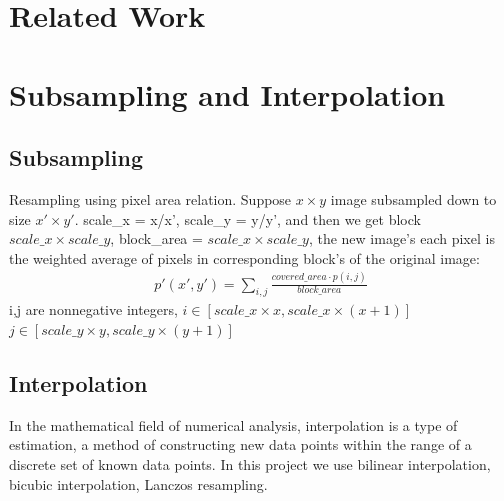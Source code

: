 \documentclass[journal,conference]{IEEEtran}
\begin{document}
\section{Related Work}
\section{Subsampling and Interpolation}

\subsection{Subsampling}
Resampling using pixel area relation. Suppose $x\times y$ image subsampled down to size $x'\times y'$. scale\_x = x/x', scale\_y = y/y', and then we get block $scale\_x \times scale\_y$, block\_area = $scale\_x \times scale\_y$, the new image's each pixel is the weighted average of pixels in corresponding block's of the original image: 
\begin{align*}
	p'(x',y')=\sum_{i,j}{\frac{covered\_area \cdot p(i,j)}{block\_area}}
\end{align*}
i,j are nonnegative integers, $i \in [scale\_x\times x,scale\_x\times (x+1)]$ $j \in [scale\_y\times y,scale\_y\times (y+1)]$

\subsection{Interpolation}
In the mathematical field of numerical analysis, interpolation is a type of estimation, a method of constructing new data points within the range of a discrete set of known data points. In this project we use bilinear interpolation, bicubic interpolation, Lanczos resampling.
\end{document}
